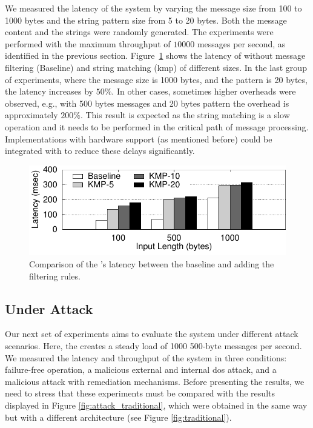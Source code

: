 We measured the latency of the system by varying the message size from 100 to 1000 bytes and the string pattern size from 5 to 20 bytes. 
Both the message content and the strings were randomly generated. 
The experiments were performed with the maximum throughput of $10 000$ messages per second, as identified in the previous section. 
Figure~\ref{fig:KMP} shows the latency of \sieveq without message filtering (Baseline) and string matching (\gls{kmp}) of different sizes.
In the last group of experiments, where the message size is 1000 bytes, and the pattern is 20 bytes, the latency increases by $50\%$. 
In other cases, sometimes higher overheads were observed, e.g., with 500 bytes messages and 20 bytes pattern the overhead is approximately $200\%$. 
This result is expected as the string matching is a slow operation and it needs to be performed in the critical path of message processing. 
Implementations with hardware support (as mentioned before) could be integrated with \sieveq to reduce these delays significantly.


\begin{figure}[!t]
\centering
\includegraphics[width=\columnwidth]{images/gnuplot/sieveq/new_plot_fw/fw.pdf}
\caption{Comparison of the \sieveq's latency between the baseline and adding the filtering rules.}
\label{fig:KMP}
\end{figure}


\subsection{\sieveq Under Attack}

Our next set of experiments aims to evaluate the system under different attack scenarios.
Here, the \sender creates a steady load of 1000 500-byte messages per second.
We measured the latency and throughput of the system in three conditions: failure-free operation, a malicious external and internal \gls{dos} attack, and a malicious attack with remediation mechanisms.
Before presenting the results, we need to stress that these experiments must be compared with the results displayed in Figure \ref{fig:attack_traditional}, which were obtained in the same way but with a different architecture (see Figure \ref{fig:traditional}).

